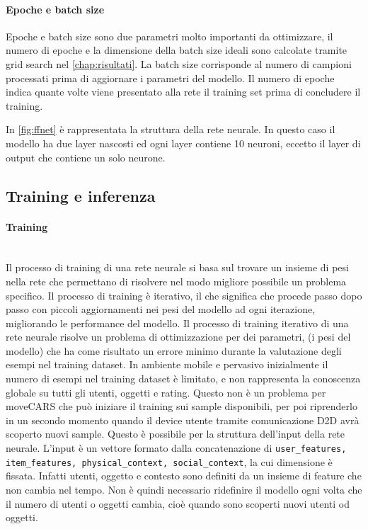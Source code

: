 \documentclass[12pt,italian]{report}
\newcommand{\myparagraph}[1]{\paragraph{#1}\mbox{}\\} %
\begin{document}
\paragraph{Epoche e batch size}
Epoche e batch size sono due parametri molto importanti da ottimizzare, il numero di epoche e la dimensione della batch size ideali sono calcolate tramite grid search nel \autoref{chap:risultati}. La batch size corrisponde al numero di campioni processati prima di aggiornare i parametri del modello. Il numero di epoche indica quante volte viene presentato alla rete il training set prima di concludere il training.

\bigskip
In \autoref{fig:ffnet} è rappresentata la struttura della rete neurale. In questo caso il modello ha due layer nascosti ed ogni layer contiene 10 neuroni, eccetto il layer di output che contiene un solo neurone.

\subsection{Training e inferenza} \label{subsec: training}
\myparagraph{Training}
Il processo di training di una rete neurale si basa sul trovare un insieme di pesi nella rete che permettano di risolvere nel modo migliore possibile un problema specifico. Il processo di training è iterativo, il che significa che procede passo dopo passo con piccoli aggiornamenti nei pesi del modello ad ogni iterazione, migliorando le performance del modello. Il processo di training iterativo di una rete neurale risolve un problema di ottimizzazione per dei parametri, (i pesi del modello) che ha come risultato un errore minimo durante la valutazione degli esempi nel training dataset. In ambiente mobile e pervasivo inizialmente il numero di esempi nel training dataset è limitato, e non rappresenta la conoscenza globale su tutti gli utenti, oggetti e rating. Questo non è un problema per moveCARS che può iniziare il training sui sample disponibili, per poi riprenderlo in un secondo momento quando il device utente tramite comunicazione D2D avrà scoperto nuovi sample. Questo è possibile per la struttura dell'input della rete neurale. L'input è un vettore formato dalla concatenazione di \texttt{user\_features, item\_features, physical\_context, social\_context}, la cui dimensione è fissata. Infatti utenti, oggetto e contesto sono definiti da un insieme di feature che non cambia nel tempo. Non è quindi necessario ridefinire il modello ogni volta che il numero di utenti o oggetti cambia, cioè quando sono scoperti nuovi utenti od oggetti.
\end{document}

